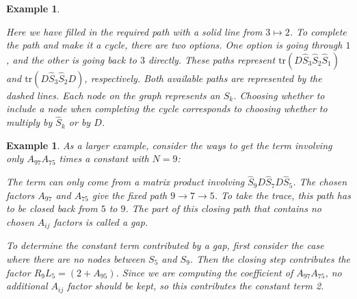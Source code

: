 \documentclass[english,master]{liumaiex}
\theoremstyle{thesisplain}
\theoremstyle{thesisdefinition}
\newtheorem{example}[proposition]{Example}
\newcommand{\tr}{\text{tr}}
\numberwithin{equation}{section}
\newcommand{\dotposition}[1]{
    ({360/\n * (#1) + 90}:\radius)
}
\begin{document}
\begin{example}
\begin{center}
\end{center}
Here we have filled in the required path with a solid line from $3 \mapsto 2$. To complete the path and make it a cycle, there are two options. One option is going through $1$, and the other is going back to $3$ directly. These paths represent $\tr(D\hat{S}_3\hat{S}_2\hat{S}_1)$ and $\tr(D\hat{S}_3\hat{S}_2D)$, respectively. Both available paths are represented by the dashed lines. Each node on the graph represents an $S_k$. Choosing whether to include a node when completing the cycle corresponds to choosing whether to multiply by $\hat{S}_k$ or by $D$.
\end{example}
\medskip
\begin{example}
As a larger example, consider the ways to get the term involving only $A_{97}A_{75}$ times a constant with $N = 9$:
\begin{center}
\end{center}

The term can only come from a matrix product involving $\hat{S}_9D\hat{S}_7D\hat{S}_5$. The chosen factors $A_{97}$ and $A_{75}$ give the fixed path $9\to7\to5$. To take the trace, this path has to be closed back from $5$ to $9$. The part of this closing path that contains no chosen $A_{ij}$ factors is called a gap.

To determine the constant term contributed by a gap, first consider the case where there are no nodes between $S_5$ and $S_9$. Then the closing step contributes the factor $R_9L_5 = (2 + A_{95})$. Since we are computing the coefficient of $A_{97}A_{75}$, no additional $A_{ij}$ factor should be kept, so this contributes the constant term 2.
\end{example}
\end{document}
